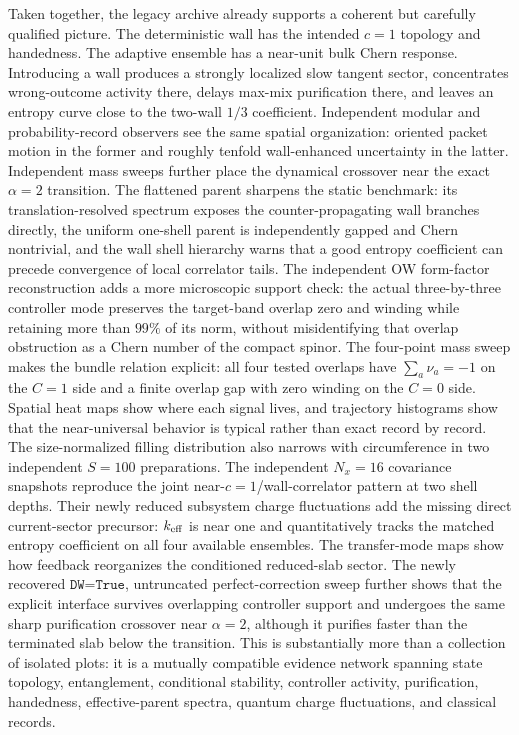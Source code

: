 \documentclass[aps,prb,twocolumn,floatfix,nofootinbib,superscriptaddress]{revtex4-2}
\begin{document}
Taken together, the legacy archive already supports a coherent but carefully qualified
picture.  The deterministic wall has the intended $c=1$ topology and handedness.  The
adaptive ensemble has a near-unit bulk Chern response.  Introducing a wall produces a
strongly localized slow tangent sector, concentrates wrong-outcome activity there, delays
max-mix purification there, and leaves an entropy curve close to the two-wall $1/3$
coefficient.  Independent modular and probability-record observers see the same spatial
organization: oriented packet motion in the former and roughly tenfold wall-enhanced
uncertainty in the latter.  Independent mass sweeps further place the dynamical crossover
near the exact $\alpha=2$ transition.  The flattened parent sharpens the static benchmark:
its translation-resolved spectrum exposes the counter-propagating wall branches directly,
the uniform one-shell parent is independently gapped and Chern nontrivial, and the wall
shell hierarchy warns that a good entropy coefficient can precede convergence of local
correlator tails.  The independent OW form-factor reconstruction adds a
more microscopic support check: the actual three-by-three controller mode preserves the
target-band overlap zero and winding while retaining more than $99\%$ of its norm, without
misidentifying that overlap obstruction as a Chern number of the compact spinor.  The
four-point mass sweep makes the bundle relation explicit: all four tested overlaps have
$\sum_a\nu_a=-1$ on the $C=1$ side and a finite overlap gap with zero winding on the
$C=0$ side.  Spatial
heat maps show where each signal lives, and
trajectory histograms show that the near-universal behavior is typical rather than exact
record by record.  The size-normalized filling distribution also narrows with
circumference in two independent $S=100$ preparations.  The independent $N_x=16$
covariance snapshots reproduce the joint near-$c=1$/wall-correlator pattern at two shell
depths.  Their newly reduced subsystem charge fluctuations add the missing direct
current-sector precursor: $k_{\rm eff}$ is near one and quantitatively tracks the matched
entropy coefficient on all four available ensembles.  The transfer-mode maps show how
feedback reorganizes the conditioned
reduced-slab sector.  The newly recovered $\texttt{DW=True}$, untruncated
perfect-correction sweep further shows that the explicit interface survives overlapping
controller support and undergoes the same sharp purification crossover near $\alpha=2$,
although it purifies faster than the terminated slab below the transition.  This is
substantially more than a collection of isolated plots: it is
a mutually compatible evidence network spanning state topology, entanglement, conditional
stability, controller activity, purification, handedness, effective-parent spectra,
quantum charge fluctuations, and classical records.
\end{document}
